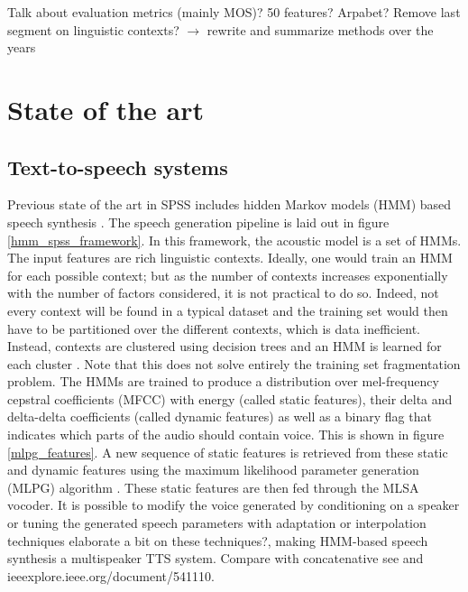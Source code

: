 \documentclass[a4paper, oneside, 12pt, english]{article}
\begin{document}
\color{red}Talk about evaluation metrics (mainly MOS)? 50 features? Arpabet? Remove last segment on linguistic contexts? $\rightarrow$ rewrite and summarize methods over the years\color{black}

\section{State of the art}

\subsection{Text-to-speech systems}
Previous state of the art in SPSS includes hidden Markov models (HMM) based speech synthesis \citep{Tokuda-2013}. The speech generation pipeline is laid out in figure \ref{hmm_spss_framework}. In this framework, the acoustic model is a set of HMMs. The input features are rich linguistic contexts. Ideally, one would train an HMM for each possible context; but as the number of contexts increases exponentially with the number of factors considered, it is not practical to do so. Indeed, not every context will be found in a typical dataset and the training set would then have to be partitioned over the different contexts, which is data inefficient. Instead, contexts are clustered using decision trees and an HMM is learned for each cluster \citep{HMMTTS}. Note that this does not solve entirely the training set fragmentation problem. The HMMs are trained to produce a distribution over mel-frequency cepstral coefficients (MFCC) with energy (called static features), their delta and delta-delta coefficients (called dynamic features) as well as a binary flag that indicates which parts of the audio should contain voice. This is shown in figure \ref{mlpg_features}. A new sequence of static features is retrieved from these static and dynamic features using the maximum likelihood parameter generation (MLPG) algorithm \citep{Tokuda-2000}. These static features are then fed through the MLSA vocoder\citep{MLSA}. It is possible to modify the voice generated by conditioning on a speaker or tuning the generated speech parameters with adaptation or interpolation techniques \citep{HMMSpeakerInterpolation} \color{red} elaborate a bit on these techniques?\color{black}, making HMM-based speech synthesis a multispeaker TTS system. \color{red} Compare with concatenative see \citep{SPSSDNN} and ieeexplore.ieee.org/document/541110.\color{black}
\end{document}
